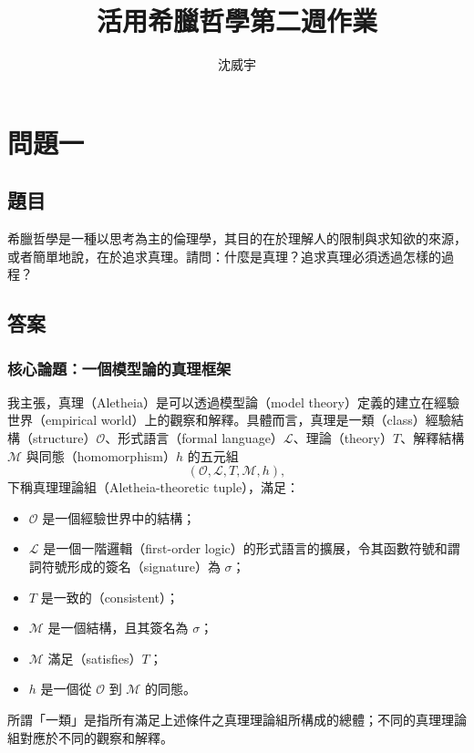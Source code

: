 \documentclass[a4paper,12pt]{article}
\begin{document}
\title{活用希臘哲學第二週作業}
\author{沈威宇}
\date{\temtoday}
\temdoc
\section{問題一}
\subsection{題目}
希臘哲學是一種以思考為主的倫理學，其目的在於理解人的限制與求知欲的來源，或者簡單地說，在於追求真理。請問：什麼是真理？追求真理必須透過怎樣的過程？
\subsection{答案}
\subsubsection{核心論題：一個模型論的真理框架}
我主張，真理（Aletheia）是可以透過模型論（model theory）定義的建立在經驗世界（empirical world）上的觀察和解釋。具體而言，真理是一類（class）經驗結構（structure）$\mathcal{O}$、形式語言（formal language）$\mathcal{L}$、理論（theory）$T$、解釋結構 $\mathcal{M}$ 與同態（homomorphism）$h$ 的五元組
\[(\mathcal{O},\mathcal{L},T,\mathcal{M},h),\]
下稱真理理論組（Aletheia-theoretic tuple），滿足：
\begin{itemize}
\item $\mathcal{O}$ 是一個經驗世界中的結構；
\item $\mathcal{L}$ 是一個一階邏輯（first-order logic）的形式語言的擴展，令其函數符號和謂詞符號形成的簽名（signature）為 $\sigma$；
\item $T$ 是一致的（consistent）；
\item $\mathcal{M}$ 是一個結構，且其簽名為 $\sigma$；
\item $\mathcal{M}$ 滿足（satisfies）$T$；
\item $h$ 是一個從 $\mathcal{O}$ 到 $\mathcal{M}$ 的同態。
\end{itemize}
所謂「一類」是指所有滿足上述條件之真理理論組所構成的總體；不同的真理理論組對應於不同的觀察和解釋。
\end{document}
